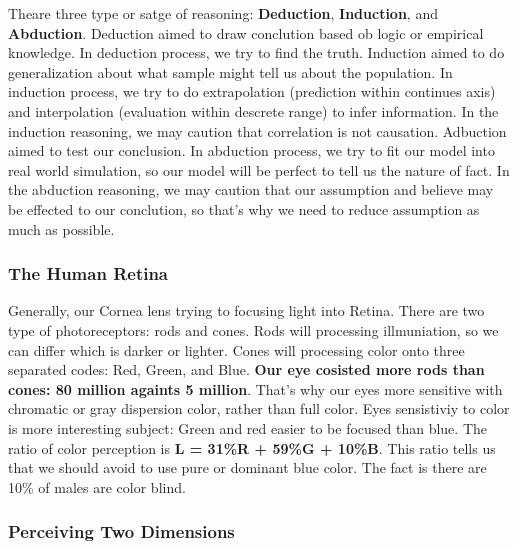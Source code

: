\documentclass[11pt]{article}
\begin{document}
Theare three type or satge of reasoning: \textbf{Deduction},
\textbf{Induction}, and \textbf{Abduction}. Deduction aimed to draw
conclution based ob logic or empirical knowledge. In deduction process,
we try to find the truth. Induction aimed to do generalization about
what sample might tell us about the population. In induction process, we
try to do extrapolation (prediction within continues axis) and
interpolation (evaluation within descrete range) to infer information.
In the induction reasoning, we may caution that correlation is not
causation. Adbuction aimed to test our conclusion. In abduction process,
we try to fit our model into real world simulation, so our model will be
perfect to tell us the nature of fact. In the abduction reasoning, we
may caution that our assumption and believe may be effected to our
conclution, so that's why we need to reduce assumption as much as
possible.

    \subsubsection{The Human Retina}\label{the-human-retina}

Generally, our Cornea lens trying to focusing light into Retina. There
are two type of photoreceptors: rods and cones. Rods will processing
illmuniation, so we can differ which is darker or lighter. Cones will
processing color onto three separated codes: Red, Green, and Blue.
\textbf{Our eye cosisted more rods than cones: 80 million againts 5
million}. That's why our eyes more sensitive with chromatic or gray
dispersion color, rather than full color. Eyes sensistiviy to color is
more interesting subject: Green and red easier to be focused than blue.
The ratio of color perception is \textbf{L = 31\%R + 59\%G + 10\%B}.
This ratio tells us that we should avoid to use pure or dominant blue
color. The fact is there are 10\% of males are color blind.

    \subsubsection{Perceiving Two
Dimensions}\label{perceiving-two-dimensions}
\end{document}
